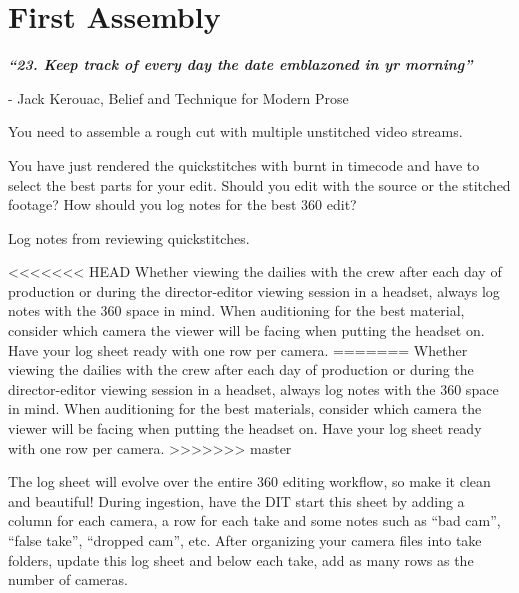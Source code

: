 \chapter{First Assembly}
\pagecolor{white}
\label{chap:31}
\begin{fullwidth}

{\itshape\bfseries “23. Keep track of every day the date emblazoned in yr morning”}

- Jack Kerouac, Belief and Technique for Modern Prose
\vspace{\baselineskip}

\problem

{\large You need to assemble a rough cut with multiple unstitched video streams. \par}

You have just rendered the quickstitches with burnt in timecode and have to select the best parts for your edit. Should you edit with the source or the stitched footage? How should you log notes for the best 360 edit?

\solution

{\large Log notes from reviewing quickstitches. \par}

<<<<<<< HEAD
Whether viewing the dailies with the crew after each day of production or during the director-editor viewing session in a headset, always log notes with the 360 space in mind. When auditioning for the best material, consider which camera the viewer will be facing when putting the headset on. Have your log sheet ready with one row per camera. 
=======
Whether viewing the dailies with the crew after each day of production or during the director-editor viewing session in a headset, always log notes with the 360 space in mind. When auditioning for the best materials, consider which camera the viewer will be facing when putting the headset on. Have your log sheet ready with one row per camera. 
>>>>>>> master


The log sheet will evolve over the entire 360 editing workflow, so make it clean and beautiful! During ingestion, have the DIT start this sheet by adding a column for each camera, a row for each take and some notes such as “bad cam”, “false take”, “dropped cam”, etc. After organizing your camera files into take folders, update this log sheet and below each take, add as many rows as the number of cameras.



\end{fullwidth}
